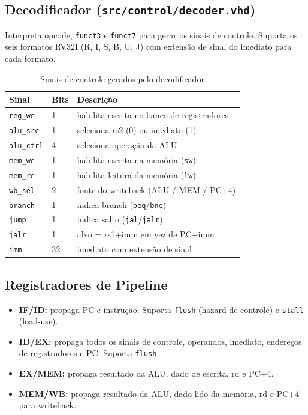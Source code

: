 \documentclass[12pt, a4paper]{article}
\newcommand{\code}[1]{\texttt{#1}}
\begin{document}
\subsection{Decodificador (\code{src/control/decoder.vhd})}

Interpreta opcode, \code{funct3} e \code{funct7} para gerar os sinais de controle.
Suporta os seis formatos RV32I (R, I, S, B, U, J) com extensão de sinal do
imediato para cada formato.

\begin{table}[H]
  \centering
  \caption{Sinais de controle gerados pelo decodificador}
  \small{}
  \begin{tabular}{lll}
    \toprule
    \rowcolor{headerblue}
    \color{white}\textbf{Sinal} & \color{white}\textbf{Bits} &
    \color{white}\textbf{Descrição} \\
    \midrule
    \code{reg\_we}   & 1 & habilita escrita no banco de registradores \\
    \code{alu\_src}  & 1 & seleciona rs2 (0) ou imediato (1) \\
    \code{alu\_ctrl} & 4 & seleciona operação da ALU \\
    \code{mem\_we}   & 1 & habilita escrita na memória (\code{sw}) \\
    \code{mem\_re}   & 1 & habilita leitura da memória (\code{lw}) \\
    \code{wb\_sel}   & 2 & fonte do writeback (ALU / MEM / PC+4) \\
    \code{branch}    & 1 & indica branch (\code{beq}/\code{bne}) \\
    \code{jump}      & 1 & indica salto (\code{jal}/\code{jalr}) \\
    \code{jalr}      & 1 & alvo = rs1+imm em vez de PC+imm \\
    \code{imm}       & 32 & imediato com extensão de sinal \\
    \bottomrule
  \end{tabular}
\end{table}

\subsection{Registradores de Pipeline}

\begin{itemize}[leftmargin=2em]
  \item \textbf{IF/ID:} propaga PC e instrução. Suporta \code{flush}
    (hazard de controle) e \code{stall} (load-use).
  \item \textbf{ID/EX:} propaga todos os sinais de controle, operandos, imediato,
    endereços de registradores e PC. Suporta \code{flush}.
  \item \textbf{EX/MEM:} propaga resultado da ALU, dado de escrita, rd e PC+4.
  \item \textbf{MEM/WB:} propaga resultado da ALU, dado lido da memória, rd e
    PC+4 para writeback.
\end{itemize}
\end{document}
